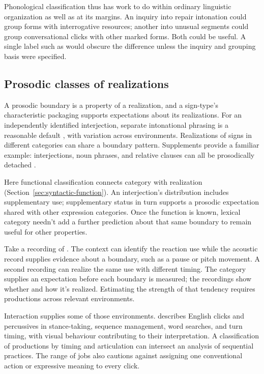 \documentclass[12pt]{article}
\begin{document}
Phonological classification thus has work to do within ordinary linguistic
organization as well as at its margins. An inquiry into repair intonation
could group forms with interrogative resources; another into unusual
segments could group conversational clicks with other marked forms.
Both could be useful. A single label such as  would obscure
the difference unless the inquiry and grouping basis were specified.

\subsection{Prosodic classes of realizations}

A prosodic boundary is a property of a realization, and a sign-type's
characteristic packaging supports expectations about its realizations.
For an independently identified interjection, separate intonational
phrasing is a reasonable default \citep[108]{ameka1992}, with
variation across environments. Realizations of
signs in different categories can share a boundary pattern. Supplements
provide a familiar example: interjections, noun phrases, and relative
clauses can all be prosodically detached
\citep[66, 1350]{HuddlestonPullum2002}.

Here functional classification connects category with realization
(Section~\ref{sec:syntactic-function}). An interjection's distribution
includes supplementary use; supplementary status in turn supports a
prosodic expectation shared with other expression categories. Once the
function is known, lexical category needn't add a further prediction
about that same boundary to remain useful for other properties.

Take a recording of . The
context can identify the reaction use while the acoustic record supplies
evidence about a boundary, such as a pause or pitch movement. A
second recording can realize the same use with different timing.
The category supplies an expectation before each boundary is measured;
the recordings show whether and how it's realized. Estimating the
strength of that tendency requires productions across relevant environments.

Interaction supplies some of those environments. \textcite{ogden2013clicks} describes English
clicks and percussives in stance-taking, sequence management, word searches,
and turn timing, with visual behaviour contributing to their interpretation. A classification of productions by timing and
articulation can intersect an analysis of sequential practices.
The range of jobs also cautions against assigning one conventional action
or expressive meaning to every click.
\end{document}
